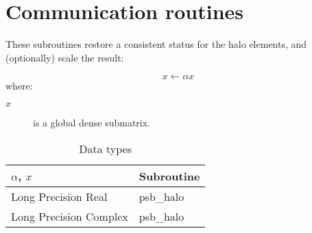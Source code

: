 \section{Communication routines}
%
%



These subroutines restore a consistent status for the halo
elements, and  (optionally) scale the result:

\[ x \leftarrow \alpha x \]
where:
\begin{description}
\item[$x$] is a global dense  submatrix.
\end{description}

\begin{table}[h]
\begin{center}
\begin{tabular}{ll}
\hline
$\alpha$, $x$ & {\bf Subroutine}\\
\hline
Long Precision Real & psb\_halo \\
Long Precision Complex & psb\_halo \\
\hline
\end{tabular}
\end{center}
\caption{Data types\label{tab:f90halo}}
\end{table}


